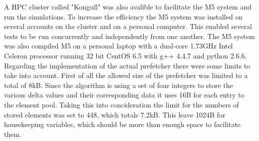 A HPC cluster called "Kongull" was also avalible to facilitate the M5 system and run the simulations. To increase the efficiency the M5 system was installed on several accounts on the cluster and on a personal computer. This enabled several tests to be run concurrently and independently from one another. The M5 system was also compiled M5 on a personal laptop with a dual-core 1.73GHz Intel Celeron processor running 32 bit CentOS 6.5 with g++ 4.4.7 and python 2.6.6. 
Regarding the implementation of the actual prefetcher there were some limits to take into account. First of all the allowed size of the prefetcher was limited to a total of 8kB. Since the algorithm is using a set of four integers to store the various delta values and their corresponding data it uses 16B for each entry to the element pool. Taking this into concideration the limit for the numbers of stored elements was set to 448, which totals 7.2kB. This leave 1024B for housekeeping variables, which should be more than enough space to facilitate them.
